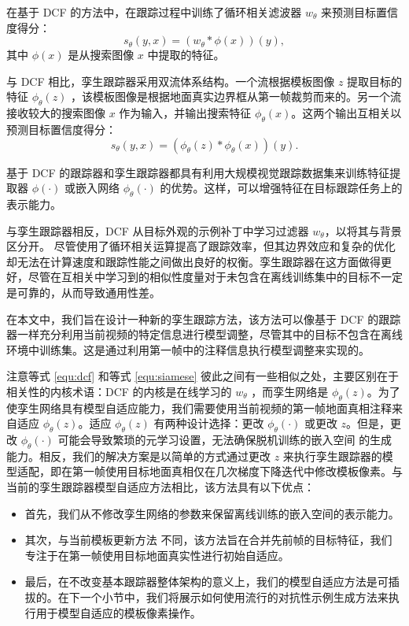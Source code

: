 在基于 DCF 的方法中，在跟踪过程中训练了循环相关滤波器 $w_{\theta}$ 来预测目标置信度得分：
\begin{equation}
    s_\theta(y,x)=(w_\theta * \phi(x))(y),
    \label{equ:dcf}
\end{equation}
其中 $\phi(x)$ 是从搜索图像 $x$ 中提取的特征。

与 DCF 相比，孪生跟踪器采用双流体系结构。一个流根据模板图像 $z$ 提取目标的特征 $\phi_\theta(z)$ ，该模板图像是根据地面真实边界框从第一帧裁剪而来的。另一个流接收较大的搜索图像 $x$ 作为输入，并输出搜索特征 $\phi_\theta(x)$。这两个输出互相关以预测目标置信度得分：
\begin{equation}
    s_\theta(y,x)=(\phi_\theta(z) * \phi_\theta(x))(y).
    \label{equ:siamese}
\end{equation}

基于 DCF 的跟踪器和孪生跟踪器都具有利用大规模视觉跟踪数据集来训练特征提取器 $\phi(\cdot)$ 或嵌入网络 $\phi_{\theta}(\cdot)$ 的优势。这样，可以增强特征在目标跟踪任务上的表示能力。

与孪生跟踪器相反，DCF 从目标外观的示例补丁中学习过滤器 $w_\theta$，以将其与背景区分开。
尽管使用了循环相关运算提高了跟踪效率，但其边界效应和复杂的优化却无法在计算速度和跟踪性能之间做出良好的权衡。孪生跟踪器在这方面做得更好，尽管在互相关中学习到的相似性度量对于未包含在离线训练集中的目标不一定是可靠的，从而导致通用性差。

在本文中，我们旨在设计一种新的孪生跟踪方法，该方法可以像基于 DCF 的跟踪器一样充分利用当前视频的特定信息进行模型调整，尽管其中的目标不包含在离线环境中训练集。这是通过利用第一帧中的注释信息执行模型调整来实现的。

注意等式 \ref{equ:dcf} 和等式 \ref{equ:siamese} 彼此之间有一些相似之处，主要区别在于相关性的内核术语：DCF 的内核是在线学习的 $w_{\theta}$ ，而孪生网络是 $\phi_\theta(z)$。为了使孪生网络具有模型自适应能力，我们需要使用当前视频的第一帧地面真相注释来自适应 $\phi_\theta(z)$。适应 $\phi_\theta(z)$ 有两种设计选择：更改 $\phi_\theta(\cdot)$ 或更改 $z$。但是，更改 $\phi_\theta(\cdot)$ 可能会导致繁琐的元学习设置，无法确保脱机训练的嵌入空间 \cite{ROAM, DBLP:conf/aaai/JungYNCH20}的生成能力。相反，我们的解决方案是以简单的方式通过更改 $z$ 来执行孪生跟踪器的模型适配，即在第一帧使用目标地面真相仅在几次梯度下降迭代中修改模板像素。与当前的孪生跟踪器模型自适应方法相比，该方法具有以下优点：

\begin{itemize}
\item 首先，我们从不修改孪生网络的参数来保留离线训练的嵌入空间的表示能力。
\item 其次，与当前模板更新方法 \cite{zhu2018distractor, Zhang_2019_ICCV} 不同，该方法旨在合并先前帧的目标特征，我们专注于在第一帧使用目标地面真实性进行初始自适应。
\item 最后，在不改变基本跟踪器整体架构的意义上，我们的模型自适应方法是可插拔的。在下一个小节中，我们将展示如何使用流行的对抗性示例生成方法来执行用于模型自适应的模板像素操作。
\end{itemize}

